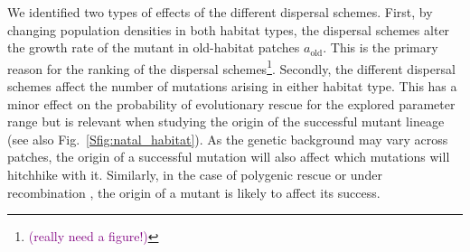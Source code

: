 \documentclass[11pt]{article}
\newcommand{\florence}[1]{\textcolor{purple}{(#1)}} %
\newcommand{\chg}[1]{\textcolor{change}{#1}}
\begin{document}
We identified two types of effects of the different dispersal schemes. First, by changing population densities in both habitat types, the dispersal schemes alter the growth rate of the mutant in old-habitat patches $a_{\text{old}}$. This is the primary reason for the ranking of the dispersal schemes\footnote{\florence{really need a figure!}}. Secondly, the different dispersal schemes affect the number of mutations arising in either habitat type. This has a minor effect on the probability of evolutionary rescue for the explored parameter range but is relevant when studying the origin of the successful mutant lineage \chg{(see also Fig.~\ref{Sfig:natal_habitat})}. As the genetic background may vary across patches, the origin of a successful mutation will also affect which mutations will hitchhike with it. Similarly, in the case of polygenic rescue or under recombination \citep[e.g.][]{uecker_2015}, the origin of a mutant is likely to affect its success.    

\end{document}
